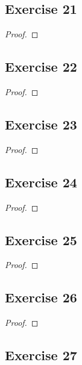 \documentclass[14pt]{extarticle}
\begin{document}
\subsection{Exercise 21}

\begin{proof}

\end{proof}

\subsection{Exercise 22}

\begin{proof}

\end{proof}

\subsection{Exercise 23}

\begin{proof}

\end{proof}

\subsection{Exercise 24}

\begin{proof}

\end{proof}

\subsection{Exercise 25}

\begin{proof}

\end{proof}

\subsection{Exercise 26}

\begin{proof}

\end{proof}

\subsection{Exercise 27}
\end{document}
